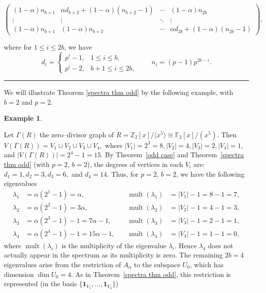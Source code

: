 \documentclass[12pt,twoside]{article}
\renewenvironment{proof}{{\noindent\bfseries Proof.}}{\qed}
\newtheorem{example}[theorem]{Example}
\def\qed{\nolinebreak\hfill\rule{.2cm}{.2cm}\par\addvspace{.5cm}}
\begin{document}
\begin{proof}
\begin{footnotesize}
\[\begin{pmatrix}
		(1-\alpha)n_{b+1} & \alpha d_{b+2} + (1-\alpha)(n_{b+2}-1) & \cdots & (1-\alpha)n_{2b}\\[2pt]
		\vdots & \vdots & \ddots & \vdots\\[2pt]
		(1-\alpha)n_{b+1} & (1-\alpha)n_{b+2} & \cdots &
		\alpha d_{2b} + (1-\alpha)(n_{2b}-1)
	\end{pmatrix},
	\]
	\end{footnotesize}
	where for $1\le i\le 2b$, we have
	\[
	d_i =
	\begin{cases}
		p^{ i} - 1, & 1\le i\le b,\\[3pt]
		p^{ i} - 2, & b+1\le i\le 2b,
	\end{cases}
	\qquad
	n_i = (p-1)p^{ 2b-i}.
	\]
\end{proof}

We will illustrate Theorem \ref{spectra thm odd} by the following example, with $b=2$ and $p=2$.\\
\begin{example}\end{example}
	Let $ \varGamma(R)$ the zero--divisor graph of $R=\mathbb{Z}_2[x]/\langle x^5\rangle\cong \mathbb{F}_2[x]/(x^5)$. 
	 Then $V( \varGamma(R))=V_1 \cup V_2 \cup V_3 \cup V_4,$	where	$|V_1|= 2^3 = 8, |V_2|= 4,|V_3| = 2, |V_4| = 1,$ and $|V( \varGamma(R))|=2^4 -1=15$. By Theorem~\ref{odd case} and Theorem~\ref{spectra thm odd} (with $p=2$, $b=2$),
	the degrees of vertices in each $V_i$ are:	$d_1 = 1, d_2 = 3, d_3 = 6, $ and $ d_4 = 14.$ 	Thus, for $p=2$, $b=2$, we have the following eigenvalues
	\[
	\begin{aligned}
		\lambda_1 &= \alpha(2^1-1) = \alpha, 
		&\quad \operatorname{mult}(\lambda_1) &= |V_1|-1 = 8-1 = 7,\\
		\lambda_2 &= \alpha(2^2-1) = 3\alpha, 
		&\quad \operatorname{mult}(\lambda_2) &= |V_2|-1 = 4-1 = 3,\\
		\lambda_3 &= \alpha(2^3-1)-1 = 7\alpha - 1,
		&\quad \operatorname{mult}(\lambda_3) &= |V_3|-1 = 2-1 = 1,\\
		\lambda_4 &= \alpha(2^4-1)-1 = 15\alpha - 1,
		&\quad \operatorname{mult}(\lambda_4) &= |V_4|-1 = 1-1 = 0,
	\end{aligned}
	\]
	where $\operatorname{mult}(\lambda_i)$ is the multiplicity of the eigenvalue $ \lambda_{i}.$ 	Hence $\lambda_4$ does not actually appear in the spectrum as  its multiplicity is zero. The remaining $2b=4$ eigenvalues arise from the restriction of $A_\alpha$ to the
	subspace $U_0$, which has dimension $\dim U_0 = 4$.  As in Theorem~\ref{spectra thm odd}, this
	restriction is represented (in the basis $\{\mathbf{1}_{V_1},\dots,\mathbf{1}_{V_4}\}$)
\end{document}
